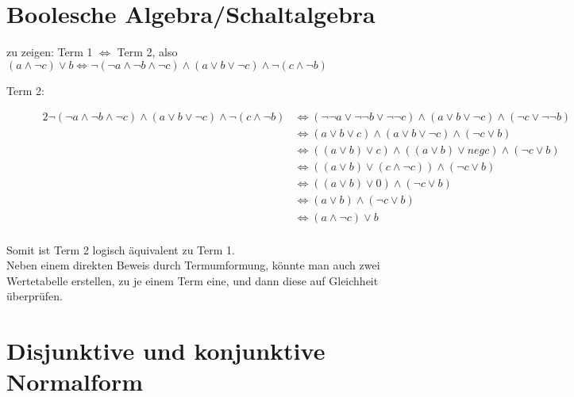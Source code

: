\documentclass{gadsescript}
\begin{document}
\section{Boolesche Algebra/Schaltalgebra}
zu zeigen: Term 1 $ \iff $ Term 2, also $ ( a \wedge \neg c ) \vee b \iff \neg ( \neg a \wedge \neg b \wedge \neg c ) \wedge ( a \vee b \vee \neg c ) \wedge \neg ( c \wedge \neg b ) $
\begin{description}
	\item[Term 2:]
		\begin{alignat*}{2}
			\neg ( \neg a \wedge \neg b \wedge \neg c ) \wedge ( a \vee b \vee \neg c ) \wedge \neg ( c \wedge \neg b ) & \iff (\neg \neg a \vee \neg\neg b \vee \neg\neg c) \wedge ( a \vee b \vee \neg c ) \wedge (\neg c \vee \neg \neg b )\\
			~&\iff ( a \vee b \vee c ) \wedge ( a \vee b \vee \neg c ) \wedge ( \neg c \vee b )\\
			~&\iff ( ( a \vee b ) \vee c ) \wedge ( ( a \vee b ) \vee neg c ) \wedge ( \neg c \vee b )\\
			~&\iff ( ( a \vee b ) \vee ( c \wedge \neg c ) )  \wedge ( \neg c \vee b )\\
			~&\iff ( ( a \vee b ) \vee 0 ) \wedge ( \neg c \vee b )\\
			~&\iff ( a \vee b ) \wedge ( \neg c \vee b )\\
			~&\iff ( a \wedge \neg c ) \vee b\\
		\end{alignat*}
\end{description}
Somit ist Term 2 logisch äquivalent zu Term 1.\\
Neben einem direkten Beweis durch Termumformung, könnte man auch zwei Wertetabelle erstellen, zu je einem Term eine, und dann diese auf Gleichheit überprüfen.

\section{Disjunktive und konjunktive Normalform}
\end{document}
